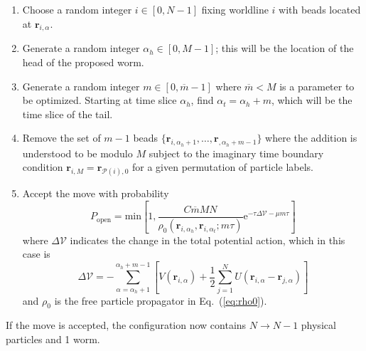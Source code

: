 \documentclass[prb,aps,amssym,nofootinbib,floatfix,notitlepage]{revtex4-1}
\renewcommand{\vec}[1]{\boldsymbol{#1}}
\newcommand{\e}[1]{\mathrm{e}^{#1}}
\renewcommand{\eqref}[1]{Eq.~(\ref{#1})}
\begin{document}
\begin{enumerate}
    \item Choose a random integer $i \in [0,N-1]$ fixing worldline $i$ with beads located
        at $\vec{r}_{i,\alpha}$.
    \item Generate a random integer $\alpha_h \in [0,M-1]$; this
        will be the location of the head of the proposed worm.
    \item Generate a random integer $m \in [0,\overline{m}-1]$ where $\overline{m} <
        M$ is a parameter to be optimized. Starting at time slice $\alpha_h$,
        find $\alpha_t = \alpha_h + m$, which will be the time slice of the tail.
    \item Remove the set of $m-1$ beads
        $\{\vec{r}_{i,\alpha_h+1},\ldots,
    \vec{r}_{,\alpha_h+m-1}\}$ where the addition is
    understood to be modulo $M$ subject to the imaginary time boundary
    condition $\vec{r}_{i,M} = \vec{r}_{\mathcal{P}(i),0}$ for a given
    permutation of particle labels.
\item Accept the move with probability
\begin{equation}
P_{\text{open}} = \mathrm{min}\left[1, 
    \frac{C \overline{m} M N}{\rho_0(\vec{r}_{i,\alpha_h},\vec{r}_{i,\alpha_t};m\tau)}
\e{-\tau \Delta \mathcal{V} - \mu m \tau} \right]
\end{equation}
%
where $\Delta \mathcal{V}$ indicates the change in the total potential action,
which in this case is
%
\begin{equation}
    \Delta\mathcal{V} = -\sum_{\alpha=\alpha_h+1}^{\alpha_h+m-1} \left[ 
        V(\vec{r}_{i,\alpha}) + \frac{1}{2}\sum_{j=1}^N
        U(\vec{r}_{i,\alpha}-\vec{r}_{j,\alpha}) \right]
\end{equation}
%
and $\rho_0$ is the free particle propagator in \eqref{eq:rho0}.
\end{enumerate}
If the move is accepted, the configuration now contains $N \to N-1$ physical
particles and 1 worm.\\[2ex]
\end{document}

